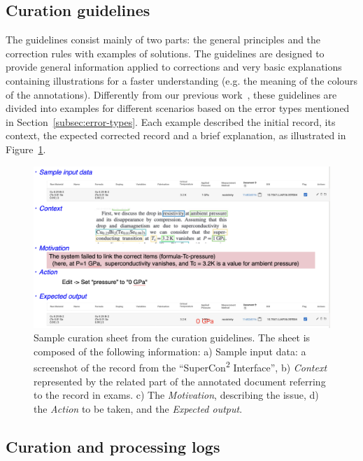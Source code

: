 \subsection{Curation guidelines}
\label{subsec:curation-guidelines}

The guidelines consist mainly of two parts: the general principles and the correction rules with examples of solutions.
The guidelines are designed to provide general information applied to corrections and very basic explanations containing illustrations for a faster understanding (e.g. the meaning of the colours of the annotations). 
Differently from our previous work~\cite{foppiano2021supermat}, these guidelines are divided into examples for different scenarios based on the error types mentioned in Section~\ref{subsec:error-types}.
Each example described the initial record, its context, the expected corrected record and a brief explanation, as illustrated in Figure~\ref{fig:example-curation-sheet}. 

\begin{figure}[htbp]
  \centering
  \includegraphics[width=1\textwidth]{figures/curation/example-sheet-curation.png} 
  \caption{Sample curation sheet from the curation guidelines. The sheet is composed of the following information: a) {Sample input data}: a screenshot of the record from the ``SuperCon\textsuperscript{2} Interface'', b) \textit{Context} represented by the related part of the annotated document referring to the record in exams. c) The \textit{Motivation}, describing the issue, d) the \textit{Action} to be taken, and the \textit{Expected output}.
 }
  \label{fig:example-curation-sheet}
\end{figure}


\subsection{Curation and processing logs}
\label{subsec:curation-and-processing-logs}

